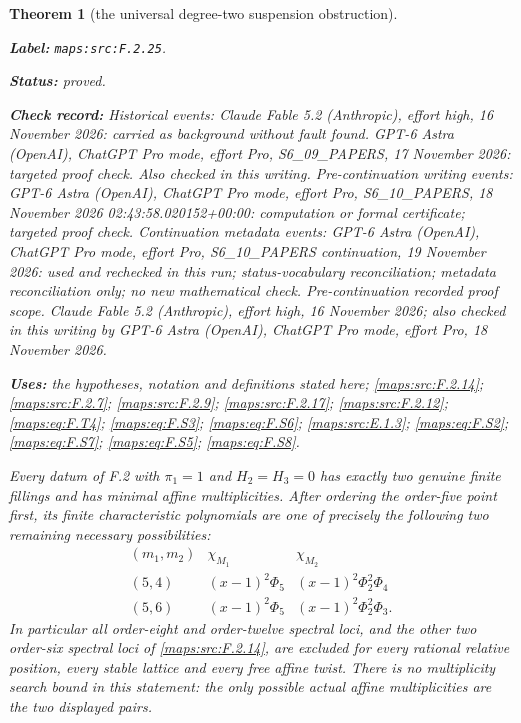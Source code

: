 \documentclass[11pt,a4paper]{article}
\newtheorem{theorem}{Theorem}[section]
\theoremstyle{definition}
\newcommand{\StatementRecord}[4]{\par\smallskip\begingroup\upshape\raggedright\noindent\textbf{Label:} \nolinkurl{#1}.\par\noindent\textbf{Status:} #2.\par\noindent\textbf{Check record:} #3.\par\noindent\textbf{Uses:} #4.\par\endgroup\smallskip}
\begin{document}
\begin{theorem}[the universal degree-two suspension obstruction]\label{maps:src:F.2.25}
\StatementRecord{maps:src:F.2.25}{proved}{Historical events: Claude Fable 5.2 (Anthropic), effort high, 16 November 2026: carried as background without fault found. GPT-6 Astra (OpenAI), ChatGPT Pro mode, effort Pro, S6\_09\_PAPERS, 17 November 2026: targeted proof check. Also checked in this writing. Pre-continuation writing events: GPT-6 Astra (OpenAI), ChatGPT Pro mode, effort Pro, S6\_10\_PAPERS, 18 November 2026 02:43:58.020152+00:00: computation or formal certificate; targeted proof check. Continuation metadata events: GPT-6 Astra (OpenAI), ChatGPT Pro mode, effort Pro, S6\_10\_PAPERS continuation, 19 November 2026: used and rechecked in this run; status-vocabulary reconciliation; metadata reconciliation only; no new mathematical check. \emph{Pre-continuation recorded proof scope.} Claude Fable 5.2 (Anthropic), effort high, 16 November 2026; also checked in this writing by GPT-6 Astra (OpenAI), ChatGPT Pro mode, effort Pro, 18 November 2026}{the hypotheses, notation and definitions stated here; \cref{maps:src:F.2.14}; \cref{maps:src:F.2.7}; \cref{maps:src:F.2.9}; \cref{maps:src:F.2.17}; \cref{maps:src:F.2.12}; \cref{maps:eq:F.T4}; \cref{maps:eq:F.S3}; \cref{maps:eq:F.S6}; \cref{maps:src:E.1.3}; \cref{maps:eq:F.S2}; \cref{maps:eq:F.S7}; \cref{maps:eq:F.S5}; \cref{maps:eq:F.S8}}


Every datum of F.2 with $\pi_1=1$ and $H_2=H_3=0$ has
exactly two genuine finite fillings and has minimal affine
multiplicities.  After ordering the order-five point first,
its finite characteristic polynomials are one of precisely
the following two remaining necessary possibilities:
\[
\begin{array}{c|c|c}
 (m_1,m_2)&\chi_{M_1}&\chi_{M_2}\\\hline
 (5,4)&(x-1)^2\Phi_5&(x-1)^2\Phi_2^2\Phi_4\\
 (5,6)&(x-1)^2\Phi_5&(x-1)^2\Phi_2^2\Phi_3.
\end{array}
 \tag{F.S1}\label{maps:eq:F.S1}
\]
In particular all order-eight and order-twelve spectral
loci, and the other two order-six spectral loci of \ref{maps:src:F.2.14},
are excluded for every rational relative position, every
stable lattice and every free affine twist.
There is no multiplicity search bound in this statement:
the only possible actual affine multiplicities are the
two displayed pairs.

\end{theorem}
\end{document}
